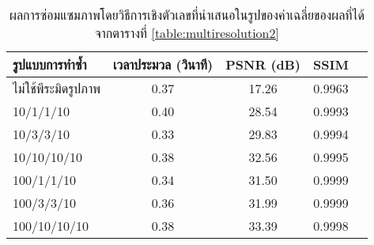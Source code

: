 \begin{table}[H]
    \centering
    \begin{tabular}[ht]{|l|c|c|c|c|}
        \hline
        รูปแบบการทำซ้ำ  & เวลาประมวล  (วินาที) & PSNR (dB) & SSIM \\
        \hline
        ไม่ใช้พีระมิดรูปภาพ & 0.37 & 17.26 & 0.9963  \\
        10/1/1/10 & 0.40 & 28.54 & 0.9993 \\
        10/3/3/10 & 0.33 & 29.83  & 0.9994 \\
        10/10/10/10 & 0.38 & 32.56 & 0.9995 \\
        100/1/1/10 & 0.34 & 31.50 & 0.9999 \\
        100/3/3/10 & 0.36 & 31.99 & 0.9999 \\
        100/10/10/10 & 0.38 & 33.39 & 0.9998 \\
        \hline
    \end{tabular}
    \caption{ผลการซ่อมแซมภาพโดยวิธีการเชิงตัวเลขที่นำเสนอในรูปของค่าเฉลี่ยของผลที่ได้จากตารางที่ \ref{table:multiresolution2}}
    \label{table:multiresolution2-summary}
\end{table}	